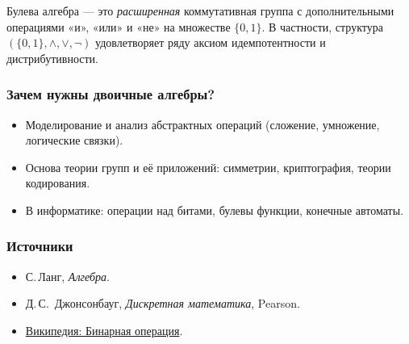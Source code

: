 Булева алгебра — это \emph{расширенная} коммутативная группа с дополнительными операциями «и», «или» и «не» на множестве $\{0,1\}$.  
В частности, структура $(\{0,1\},\wedge,\vee,\neg)$ удовлетворяет ряду аксиом идемпотентности и дистрибутивности.

\subsubsection{Зачем нужны двоичные алгебры?}

\begin{itemize}[leftmargin=*]
  \item Моделирование и анализ абстрактных операций (сложение, умножение, логические связки).
  \item Основа теории групп и её приложений: симметрии, криптография, теории кодирования.
  \item В информатике: операции над битами, булевы функции, конечные автоматы.
\end{itemize}

\subsubsection{Источники}

\begin{itemize}
  \item С.\,Ланг, \emph{Алгебра}.
  \item Д.\,С. Джонсонбауг, \emph{Дискретная математика}, Pearson.
  \item \href{https://ru.wikipedia.org/wiki/Бинарная_операция}{Википедия: Бинарная операция}.
\end{itemize}